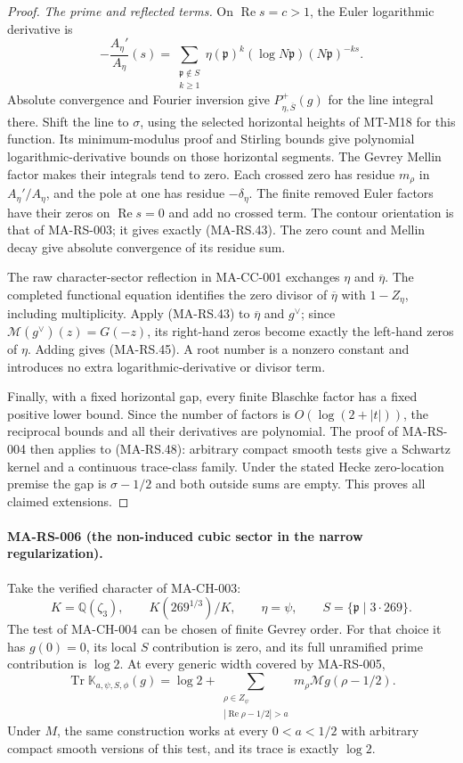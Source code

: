 \begin{proof}
\emph{The prime and reflected terms.}
On $\operatorname{Re}s=c>1$, the Euler logarithmic derivative is
\[
 -\frac{A_\eta'}{A_\eta}(s)
   =\sum_{\substack{\mathfrak p\notin S\\k\ge1}}
              \eta(\mathfrak p)^k(\log N\mathfrak p)
                                     (N\mathfrak p)^{-ks}.
\]
Absolute convergence and Fourier inversion give
$P^+_{\eta,\overline S}(g)$ for the line integral there.
Shift the line to $\sigma$, using the selected horizontal
heights of MT-M18 for this function. Its minimum-modulus
proof and Stirling bounds give polynomial logarithmic-derivative
bounds on those horizontal segments. The Gevrey Mellin factor
makes their integrals tend to zero.
Each crossed zero has residue $m_\rho$ in $A_\eta'/A_\eta$,
and the pole at one has residue $-\delta_\eta$.
The finite removed Euler factors have their zeros on
$\operatorname{Re}s=0$ and add no crossed term.
The contour orientation is that of MA-RS-003; it gives exactly
(MA-RS.43). The zero count and Mellin decay give absolute
convergence of its residue sum.

The raw character-sector reflection in MA-CC-001 exchanges
$\eta$ and $\overline\eta$. The completed functional equation
identifies the zero divisor of $\overline\eta$ with
$1-Z_\eta$, including multiplicity. Apply (MA-RS.43) to
$\overline\eta$ and $g^\vee$; since
$\mathcal M(g^\vee)(z)=G(-z)$, its right-hand zeros become
exactly the left-hand zeros of $\eta$. Adding gives (MA-RS.45).
A root number is a nonzero constant and introduces no extra
logarithmic-derivative or divisor term.

Finally, with a fixed horizontal gap, every finite Blaschke
factor has a fixed positive lower bound. Since the number of
factors is $O(\log(2+|t|))$, the reciprocal bounds and all their
derivatives are polynomial. The proof of MA-RS-004 then applies
to (MA-RS.48): arbitrary compact smooth tests give a Schwartz
kernel and a continuous trace-class family. Under the stated
Hecke zero-location premise the gap is $\sigma-1/2$ and both
outside sums are empty. This proves all claimed extensions.
\end{proof}

\paragraph{MA-RS-006 (the non-induced cubic sector in the narrow regularization).}
Take the verified character of MA-CH-003:
\[
 K=\mathbb Q(\zeta_3),\qquad
 K(269^{1/3})/K,\qquad \eta=\psi,\qquad
 S=\{\mathfrak p\mid3\cdot269\}.
\]
The test of MA-CH-004 can be chosen of finite Gevrey order.
For that choice it has $g(0)=0$, its local $S$ contribution
is zero, and its full unramified prime contribution is $\log2$.
At every generic width covered by MA-RS-005,
\[
 \operatorname{Tr}\mathbb K_{a,\psi,S,\phi}(g)
     =\log2+
       \sum_{\substack{\rho\in Z_\psi\\
                    |\operatorname{Re}\rho-1/2|>a}}
                       m_\rho\mathcal Mg(\rho-1/2).
 \tag{MA-RS.51}
\]
Under $M$, the same construction works at every $0<a<1/2$
with arbitrary compact smooth versions of this test, and its
trace is exactly $\log2$.

